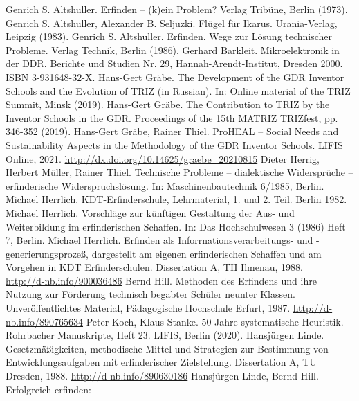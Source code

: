 \documentclass[11pt,a4paper]{article}
\begin{document}
\begin{thebibliography}{xxx}
 Genrich S. Altshuller. Erfinden – (k)ein Problem?
  Verlag Tribüne, Berlin (1973).
  Genrich S. Altshuller, Alexander B. Seljuzki. Flügel
  für Ikarus. Urania-Verlag, Leipzig (1983).
 Genrich S. Altshuller. Erfinden. Wege zur Lösung
  technischer Probleme. Verlag Technik, Berlin (1986). 
 Gerhard Barkleit. Mikroelektronik in der DDR.  Berichte und
  Studien Nr. 29, Hannah-Arendt-Institut, Dresden 2000.  ISBN 3-931648-32-X.
 Hans-Gert Gräbe. The Development of the GDR Inventor
  Schools and the Evolution of TRIZ (in Russian). In: Online material of the
  TRIZ Summit, Minsk (2019).
 Hans-Gert Gräbe. The Contribution to TRIZ by the
  Inventor Schools in the GDR. Proceedings of the 15th MATRIZ TRIZfest, pp.
  346-352 (2019).
 Hans-Gert Gräbe, Rainer Thiel. ProHEAL – Social Needs and
  Sustainability Aspects in the Methodology of the GDR Inventor Schools.
  LIFIS Online, 2021. \url{http://dx.doi.org/10.14625/graebe_20210815}
 Dieter Herrig, Herbert Müller, Rainer Thiel. Technische
  Probleme -- dialektische Widersprüche -- erfinderische Widerspruchslösung.
  In: Maschinenbautechnik 6/1985, Berlin.
 Michael Herrlich. KDT-Erfinderschule, Lehrmaterial, 
  1. und 2. Teil.  Berlin 1982.
 Michael Herrlich. Vorschläge zur künftigen Gestaltung
  der Aus- und Weiterbildung im erfinderischen Schaffen. In: Das
  Hochschulwesen 3 (1986) Heft 7, Berlin.  
 Michael Herrlich. Erfinden als
  Inforrnationsverarbeitungs- und -generierungsprozeß, dargestellt am eigenen
  erfinderischen Schaffen und am Vorgehen in KDT Erfinderschulen. Dissertation
  A, TH Ilmenau, 1988.\\ \url{http://d-nb.info/900036486}
 Bernd Hill. Methoden des Erfindens und ihre Nutzung zur
  Förderung technisch begabter Schüler neunter Klassen. Unveröffentlichtes
  Material, Pädagogische Hochschule Erfurt, 1987.
  \url{http://d-nb.info/890765634}
 Peter Koch, Klaus Stanke. 50 Jahre systematische Heuristik.
  Rohrbacher Manuskripte, Heft 23. LIFIS, Berlin (2020).
 Hansjürgen Linde. Gesetzmäßigkeiten, methodische Mittel
  und Strategien zur Bestimmung von Entwicklungsaufgaben mit erfinderischer
  Zielstellung.  Dissertation A, TU Dresden, 1988.
  \url{http://d-nb.info/890630186} 
 Hansjürgen Linde, Bernd Hill.  Erfolgreich erfinden:

\end{thebibliography}
\end{document}
